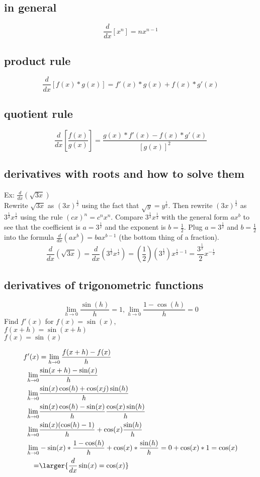 \documentclass[a4paper, 12p]{report}
\begin{document}
\subsection{in general}
\[\frac{d}{dx}[x^n] = nx^{n-1}\]

\subsection{product rule}
\[\frac{d}{dx}\left[f(x)*g(x)\right]=f'(x)*g(x)+f(x)*g'(x)\]

\subsection{quotient rule}
\[\frac{d}{dx} \left[\frac{f(x)}{g(x)}\right]=
\frac{g(x)*f'(x)-f(x)*g'(x)}{[g(x)]^2}\]

\subsection{derivatives with roots and how to solve them}
Ex: $\frac{d}{dx}(\sqrt{3x})$\\
Rewrite $\sqrt{3x}$ as $(3x)^\frac{1}{2}$ using the fact that
$\sqrt{y}=y^\frac{1}{2}$. Then rewrite $(3x)^\frac{1}{2}$ as
$3^\frac{1}{2}x^\frac{1}{2}$ using the rule $(cx)^n = c^n x^n$. Compare
$3^\frac{1}{2} x^\frac{1}{2}$ with the general form $ax^b$ to see that the
coefficient is $a = 3^\frac{1}{2}$ and the exponent is $b = \frac{1}{2}$. Plug 
$a = 3^\frac{1}{2}$ and $b=\frac{1}{2}$ into the formula
$\frac{d}{dx}(ax^b)=bax^{b-1}$ (the bottom thing of a fraction).
\[\frac{d}{dx}(\sqrt{3x})=\frac{d}{dx}(3^\frac{1}{2}x^\frac{1}{2})=(\frac{1}{2})(3^{\frac{1}{2}})x^{\frac{1}{2}-1}=\frac{3^{\frac{1}{2}}}{2}x^{-\frac{1}{2}}\]

\subsection{derivatives of trigonometric functions}
\[\lim_{h \rightarrow 0}\frac{\sin(h)}{h}=1, \lim_{h \rightarrow 0}\frac{1-\cos(h)}{h}=0\]
Find $f'(x)$ for $f(x)=\sin(x)$,\\
$f(x+h)=\sin(x+h)$\\
$f(x)=\sin(x)$


\begin{eqnarray*}
     f'(x) &= \lim_{h \rightarrow 0} \frac{f(x+h)-f(x)}{h}	\\ 
    \lim_{h \rightarrow 0}&\frac{\sin(x+h)-\sin(x)}{h}	\\
    \lim_{h \rightarrow 0}&\frac{\sin(x)\cos(h)+\cos(xj)\sin(h)}{h}	\\
    \lim_{h \rightarrow0}&\frac{\sin(x)\cos(h)-\sin(x)}{h}\frac{\cos(x)\sin(h)}{h}		\\
    \lim_{h \rightarrow0}&\frac{\sin(x)(\cos(h)-1)}{h}+\cos(x)\frac{\sin(h)}{h}		\\
    \lim_{h \rightarrow0}&-\sin(x)*\frac{1-\cos(h)}{h}+\cos(x)*\frac{\sin(h)}{h}=0+\cos(x)*1=\cos(x) \\
    =&\larger{\frac{d}{dx}\sin(x)=\cos(x)}
\end{eqnarray*}
\end{document}
